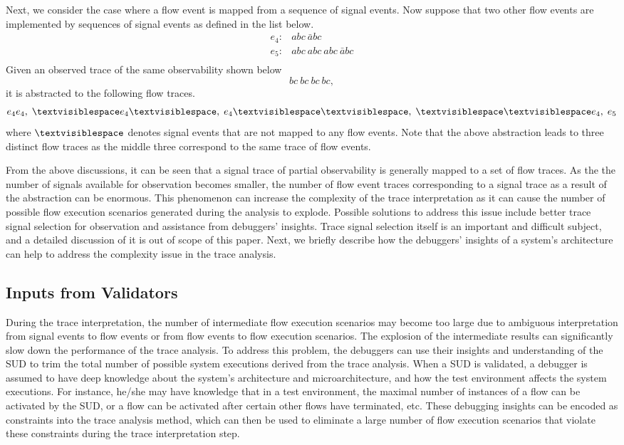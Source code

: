 \documentclass[conference]{IEEEtran}
\begin{document}
Next, we consider the case where a flow event is mapped from a sequence of signal events.  Now suppose that two other flow events are implemented by sequences of signal events as defined in the list below.
\[
\begin{array}{cl}
e_4: & abc\ \bar{a}bc\\
e_5: & abc\ abc\ abc\ \bar{a}bc\\
\end{array}
\] 
Given an observed trace of the same observability shown below
\[
bc\ bc\ bc \ bc,
\]
it is abstracted to the following flow traces.
\[
e_4e_4,\; \textvisiblespace e_4 \textvisiblespace,\;  e_4 \textvisiblespace \textvisiblespace,\;  \textvisiblespace \textvisiblespace e_4, \; e_5
\] 
where $\textvisiblespace$ denotes signal events that are not mapped to any flow events.  Note that the above abstraction leads to three distinct flow traces as the middle three correspond to the same trace of flow events. 


From the above discussions, it can be seen that a signal trace of partial observability is generally mapped to a set of flow traces.  As the the number of signals available for observation becomes smaller, the number of flow event traces corresponding to a signal trace as a result of the abstraction can be enormous.  This phenomenon can increase the complexity of the trace interpretation as it can cause the number of possible flow execution scenarios generated during the analysis to explode.   Possible solutions to address this issue include better trace signal selection for observation and assistance from debuggers' insights.  Trace signal selection itself is an important and difficult subject, and a detailed discussion of it is out of scope of this paper.   Next, we briefly describe how the debuggers' insights of a system's architecture can help to address the complexity issue in the trace analysis.


\subsection{Inputs from Validators}

During the trace interpretation, the number of intermediate flow execution scenarios may become too large due to ambiguous interpretation from signal events to flow events or from flow events to flow execution scenarios.  The explosion of the intermediate results can significantly slow down the performance of the trace analysis.  To address this problem, the debuggers can use their insights and understanding of the SUD to trim the total number of possible system executions derived from the trace analysis.  When a SUD is validated, a debugger is assumed to have deep knowledge about the system's architecture and microarchitecture, and how the test environment affects the system executions.  For instance, he/she may have knowledge that in a test environment, the maximal number of instances of a flow can be activated by the SUD, or a flow can be activated after certain other flows have terminated, etc.  These debugging insights can be encoded as constraints into the trace analysis method, which can then be used to eliminate a large number of flow execution scenarios that violate these constraints during the trace interpretation step.
\end{document}
